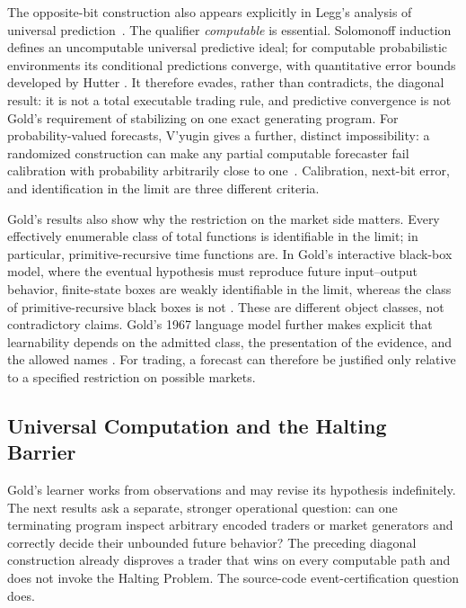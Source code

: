 \documentclass[aps,pra,reprint,superscriptaddress,amsmath,amssymb,floatfix]{revtex4-2}
\theoremstyle{plain}
\theoremstyle{definition}
\theoremstyle{remark}
\begin{document}
The opposite-bit construction also appears explicitly in Legg's analysis of
universal prediction~\cite{Legg2006}. The qualifier \emph{computable} is
essential. Solomonoff induction defines an uncomputable universal predictive
ideal; for computable probabilistic environments its conditional predictions
converge, with quantitative error bounds developed by Hutter
\cite{solomonoff,solomonoff-II,solomonoff1,Hutter2001}. It therefore evades,
rather than contradicts, the diagonal result: it is not a total executable
trading rule, and predictive convergence is not Gold's requirement of
stabilizing on one exact generating program. For probability-valued forecasts,
V'yugin gives a further, distinct impossibility: a randomized construction can
make any partial computable forecaster fail calibration with probability
arbitrarily close to one~\cite{Vyugin2006}. Calibration, next-bit error, and
identification in the limit are three different criteria.

Gold's results also show why the restriction on the market side matters. Every
effectively enumerable class of total functions is identifiable in the limit;
in particular, primitive-recursive time functions are. In Gold's interactive
black-box model, where the eventual hypothesis must reproduce future
input--output behavior, finite-state boxes are weakly identifiable in the
limit, whereas the class of primitive-recursive black boxes is not
\cite{go-65}. These are different object classes, not contradictory claims.
Gold's 1967 language model further makes explicit that learnability depends on
the admitted class, the presentation of the evidence, and the allowed names
\cite{go-67}. For trading, a forecast can therefore be justified only relative
to a specified restriction on possible markets.

\subsection{Universal Computation and the Halting Barrier}

Gold's learner works from observations and may revise its hypothesis
indefinitely. The next results ask a separate, stronger operational question:
can one terminating program inspect arbitrary encoded traders or market
generators and correctly decide their unbounded future behavior? The preceding
diagonal construction already disproves a trader that wins on every computable
path and does not invoke the Halting Problem. The source-code
event-certification question does.
\end{document}
